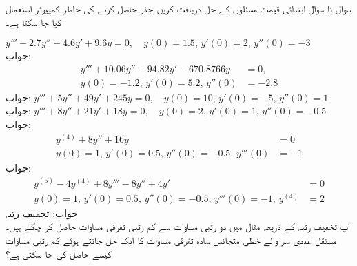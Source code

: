 سوال  تا سوال  ابتدائی قیمت مسئلوں کے حل دریافت کریں۔جذر حاصل کرنے کی خاطر کمپیوٹر استعمال کیا جا سکتا ہے۔

\quad
$y'''-2.7y''-4.6y'+9.6y=0,\quad y(0)=1.5, \,y'(0)=2, \, y''(0)=-3$\\
جواب:
\begin{align*}
y'''+10.06y''-94.82y'-670.8766y&=0,\\
 y(0)=-1.2,\, y'(0)=5.2, \, y''(0)&=-2.8
\end{align*}
جواب:
\quad
$y'''+5y''+49y'+245y=0,\quad y(0)=10, \,y'(0)=-5, \, y''(0)=1$\\
جواب:
\quad
$y'''+8y''+21y'+18y=0,\quad y(0)=2, \,y'(0)=1, \, y''(0)=-0.5$\\
جواب:
\begin{align*}
y^{(4)}+8y''+16y&=0 \\
y(0)=1, \,y'(0)=0.5, \, y''(0)=-0.5,\, y'''(0)&=-1
\end{align*}
جواب:
\begin{align*}
y^{(5)}-4y^{(4)}+8y'''-8y''+4y'&=0 \\
y(0)=1, \,y'(0)=0.5, \, y''(0)=-0.5,\, y'''(0)=-1, \, y^{(4)}&=2
\end{align*}
جواب:
\quad تخفیف رتبہ\\
آپ تخفیف رتبہ کے ذریعہ مثال  میں دو رتبی مساوات سے  کم رتبی تفرقی مساوات حاصل کر چکے ہیں۔ مستقل عددی سر والے خطی متجانس سادہ تفرقی مساوات کا ایک حل  جانتے ہوئے کم رتبی مساوات کیسے حاصل کی جا سکتی ہے؟

